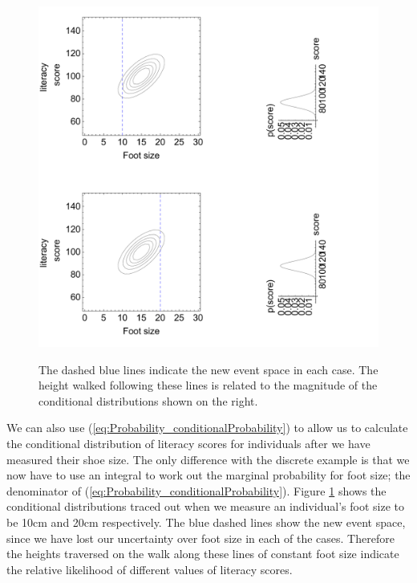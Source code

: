 \documentclass[11pt,fullpage]{book}
\begin{document}
\begin{figure}
\centering
\scalebox{0.5} 
{\includegraphics{Probability_footSizeIntelligenceConditional.pdf}}
\caption{The dashed blue lines indicate the new event space in each case. The height walked following these lines is related to the magnitude of the conditional distributions shown on the right.}\label{fig:Probability_footSizeIntelligenceConditional}
\end{figure}

We can also use (\ref{eq:Probability_conditionalProbability}) to allow us to calculate the conditional distribution of literacy scores for individuals after we have measured their shoe size. The only difference with the discrete example is that we now have to use an integral to work out the marginal probability for foot size; the denominator of (\ref{eq:Probability_conditionalProbability}). Figure \ref{fig:Probability_footSizeIntelligenceConditional} shows the conditional distributions traced out when we measure an individual's foot size to be 10cm and 20cm respectively. The blue dashed lines show the new event space, since we have lost our uncertainty over foot size in each of the cases. Therefore the heights traversed on the walk along these lines of constant foot size indicate the relative likelihood of different values of literacy scores. 
\end{document}
